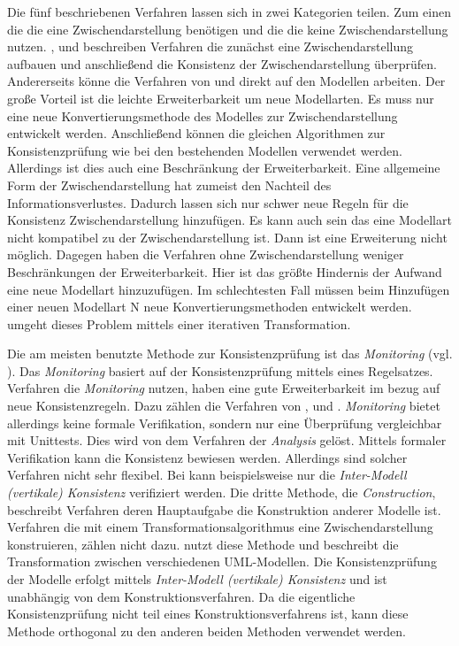 Die fünf beschriebenen Verfahren lassen sich in zwei Kategorien teilen.
Zum einen die die eine Zwischendarstellung benötigen und die die keine Zwischendarstellung nutzen.
\cite{Rasch2003}, \cite{Shinkawa2006} und \cite{Mens2005} beschreiben Verfahren die zunächst eine Zwischendarstellung aufbauen und anschließend die Konsistenz der Zwischendarstellung überprüfen.
Andererseits könne die Verfahren von \cite{Egyed2001} und \cite{Egyed2006} direkt auf den Modellen arbeiten.
Der große Vorteil ist die leichte Erweiterbarkeit um neue Modellarten.
Es muss nur eine neue Konvertierungsmethode des Modelles zur Zwischendarstellung entwickelt werden.
Anschließend können die gleichen Algorithmen zur Konsistenzprüfung wie bei den bestehenden Modellen verwendet werden.
Allerdings ist dies auch eine Beschränkung der Erweiterbarkeit.
Eine allgemeine Form der Zwischendarstellung hat zumeist den Nachteil des Informationsverlustes.
Dadurch lassen sich nur schwer neue Regeln für die Konsistenz Zwischendarstellung hinzufügen.
Es kann auch sein das eine Modellart nicht kompatibel zu der Zwischendarstellung ist.
Dann ist eine Erweiterung nicht möglich.
Dagegen haben die Verfahren ohne Zwischendarstellung weniger Beschränkungen der Erweiterbarkeit.
Hier ist das größte Hindernis der Aufwand eine neue Modellart hinzuzufügen.
Im schlechtesten Fall müssen beim Hinzufügen einer neuen Modellart N neue Konvertierungsmethoden entwickelt werden.
\cite{Egyed2001} umgeht dieses Problem mittels einer iterativen Transformation.

Die am meisten benutzte Methode zur Konsistenzprüfung ist das \emph{Monitoring} (vgl. \cite{Usman2008}).
Das \emph{Monitoring} basiert auf der Konsistenzprüfung mittels eines Regelsatzes. 
Verfahren die \emph{Monitoring} nutzen, haben eine gute Erweiterbarkeit im bezug auf neue Konsistenzregeln.
Dazu zählen die Verfahren von \cite{Rasch2003}, \cite{Mens2005} und \cite{Egyed2006}.
\emph{Monitoring} bietet allerdings keine formale Verifikation, sondern nur eine Überprüfung vergleichbar mit Unittests.
Dies wird von dem Verfahren der \emph{Analysis} gelöst.
Mittels formaler Verifikation kann die Konsistenz bewiesen werden.
Allerdings sind solcher Verfahren nicht sehr flexibel.
Bei \cite{Shinkawa2006} kann beispielsweise nur die \emph{Inter-Modell (vertikale) Konsistenz} verifiziert werden.
Die dritte Methode, die \emph{Construction}, beschreibt Verfahren deren Hauptaufgabe die Konstruktion anderer Modelle ist.
Verfahren die mit einem Transformationsalgorithmus eine Zwischendarstellung konstruieren, zählen nicht dazu.
\cite{Egyed2001} nutzt diese Methode und beschreibt die Transformation zwischen verschiedenen UML-Modellen.
Die Konsistenzprüfung der Modelle erfolgt mittels \emph{Inter-Modell (vertikale) Konsistenz} und ist unabhängig von dem Konstruktionsverfahren.
Da die eigentliche Konsistenzprüfung nicht teil eines Konstruktionsverfahrens ist, kann diese Methode orthogonal zu den anderen beiden Methoden verwendet werden.
